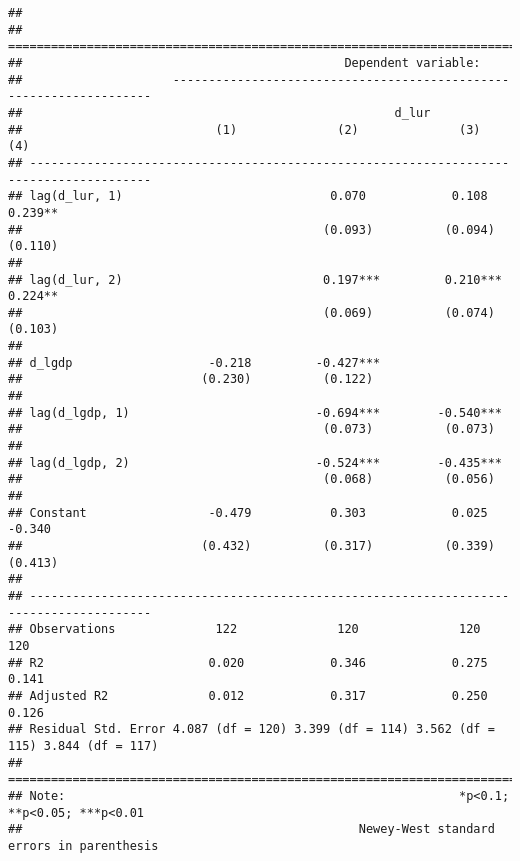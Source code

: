\documentclass[
]{article}
\begin{document}
\begin{verbatim}
## 
## =======================================================================================
##                                             Dependent variable:                        
##                     -------------------------------------------------------------------
##                                                    d_lur                               
##                           (1)              (2)              (3)              (4)       
## ---------------------------------------------------------------------------------------
## lag(d_lur, 1)                             0.070            0.108           0.239**     
##                                          (0.093)          (0.094)          (0.110)     
##                                                                                        
## lag(d_lur, 2)                            0.197***         0.210***         0.224**     
##                                          (0.069)          (0.074)          (0.103)     
##                                                                                        
## d_lgdp                   -0.218         -0.427***                                      
##                         (0.230)          (0.122)                                       
##                                                                                        
## lag(d_lgdp, 1)                          -0.694***        -0.540***                     
##                                          (0.073)          (0.073)                      
##                                                                                        
## lag(d_lgdp, 2)                          -0.524***        -0.435***                     
##                                          (0.068)          (0.056)                      
##                                                                                        
## Constant                 -0.479           0.303            0.025            -0.340     
##                         (0.432)          (0.317)          (0.339)          (0.413)     
##                                                                                        
## ---------------------------------------------------------------------------------------
## Observations              122              120              120              120       
## R2                       0.020            0.346            0.275            0.141      
## Adjusted R2              0.012            0.317            0.250            0.126      
## Residual Std. Error 4.087 (df = 120) 3.399 (df = 114) 3.562 (df = 115) 3.844 (df = 117)
## =======================================================================================
## Note:                                                       *p<0.1; **p<0.05; ***p<0.01
##                                               Newey-West standard errors in parenthesis
\end{verbatim}
\end{document}
